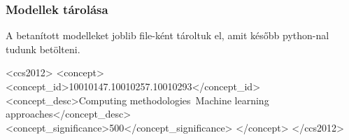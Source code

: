 \documentclass[acmtog, authorversion]{acmart}
\begin{document}
\subsubsection{Modellek tárolása}
A betanított modelleket joblib file-ként tároltuk el, amit később python-nal tudunk betölteni.






\begin{CCSXML}
    <ccs2012>
        <concept>
            <concept_id>10010147.10010257.10010293</concept_id>
            <concept_desc>Computing methodologies~Machine learning approaches</concept_desc>
            <concept_significance>500</concept_significance>
            </concept>
    </ccs2012>
\end{CCSXML}
\end{document}

